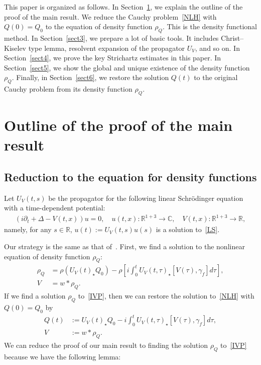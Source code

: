 \documentclass[AHL,Unicode,longabstracts,MathTools,published]{cedram}
\newcommand{\BC}{\mathbb{C}}
\newcommand{\BR}{\mathbb{R}}
\newcommand{\ga}{\gamma}
\newcommand{\ta}{\tau}
\newcommand{\rh}{\rho}
\newcommand{\De}{\Delta}
\newcommand{\pl}{\partial}
\newcommand{\Dk}[1]{\left[#1\right]}
\newcommand{\st}{\star}
\begin{document}
This paper is organized as follows. In Section~\ref{sect2}, we explain the outline of the proof of the main result. We reduce the Cauchy problem~\eqref{NLH} with $Q(0)=Q_0$ to the equation of density function $\rh_Q$. This is the density functional method. In Section~\ref{sect3}, we prepare a lot of basic tools. It includes Christ--Kiselev type lemma, resolvent expansion of the propagator $U_V$, and so on. In Section~\ref{sect4}, we prove the key Strichartz estimates in this paper. In Section~\ref{sect5}, we show the global and unique existence of the density function $\rh_Q$. Finally, in Section~\ref{sect6}, we restore the solution $Q(t)$ to the original Cauchy problem from its density function $\rh_Q$.



\section{Outline of the proof of the main result}\label{sect2}
\subsection{Reduction to the equation for density functions}

Let $U_V(t,s)$ be the propagator for the following linear Schr\"odinger equation with a time-dependent potential:
\begin{align}\label{LS}
(i \pl_t + \De -V(t,x))u = 0, \quad u(t,x) : \BR^{1+3} \to \BC, \quad V(t,x):\BR^{1+3} \to \BR,
\end{align}
namely, for any $s \in \BR$, $u(t):= U_V(t,s)u(s)$ is a solution to~\eqref{LS}.

Our strategy is the same as that of~\cite{2018CHP,2014LS}. First, we find a solution to the nonlinear equation of density function $\rh_Q$:
\begin{align}
\tag{IVP} 
\rh_Q &= \rh(U_V(t)_\st Q_0) - \rh\Dk{i\int_0^t U_V(t,\ta)_\st [V(\ta),\ga_f] d\ta}, \label{IVP}\\
V &=w \ast \rh_Q.
\end{align}
If we find a solution $\rh_Q$ to~\eqref{IVP}, then we can restore the solution to~\eqref{NLH} with $Q(0)=Q_0$ by
\begin{align}\label{eq Q}
Q(t) &:= U_V(t)_\st Q_0 - i\int_0^t U_V(t,\ta)_\st [V(\ta),\ga_f] d\ta, \\
V &:= w \ast \rh_Q.
\end{align}
We can reduce the proof of our main result to finding the solution $\rh_Q$ to~\eqref{IVP} because we have the following lemma:
\end{document}
